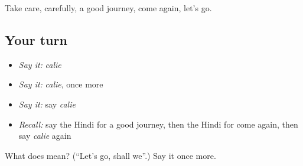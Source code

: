 \begin{grammarlens}[title={What you've built}]
Take care, carefully, a good journey, come again, let's go.
\end{grammarlens}

\subsection*{Your turn}
\begin{itemize}
\raggedright
  \item \emph{Say it:} \emph{calie}
  \item \emph{Say it:} \emph{calie}, once more
  \item \emph{Say it:} say \emph{calie}
  \item \emph{Recall:} say the Hindi for a good journey, then the Hindi for come again, then say \emph{calie} again
\end{itemize}

\begin{tcolorbox}[breakable,colback=teal!4,colframe=teal!35!black,title={Before you move on}]
What does  mean? (\textquotedblleft{}Let's go, shall we\textquotedblright{}.) Say it once more.
\end{tcolorbox}
